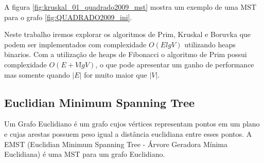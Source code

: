 \documentclass[12pt,a4paper]{article}
\begin{document}

A figura \ref{fig:kruskal_01_quadrado2009_mst} mostra um exemplo de uma MST para
o grafo \ref{fig:QUADRADO2009_ini}.


Neste trabalho iremos explorar os algoritmos de Prim, Kruskal e Boruvka que
podem ser implementados com complexidade $O(E lg V)$ utilizando heaps binarios.
Com a utilização de heaps de Fibonacci o algoritmo de Prim possui complexidade
$O(E + V lg V)$, o que pode apresentar um ganho de performance mas somente
quando $|E|$ for muito maior que $|V|$.

\subsection{Euclidian Minimum Spanning Tree}


Um Grafo Euclidiano é um grafo cujos vértices representam pontos em um plano e
cujas arestas possuem peso igual a distância euclidiana entre esses pontos. A
EMST (Euclidian Minimum Spanning Tree - Árvore Geradora Mínima Euclidiana) é uma
MST para um grafo Euclidiano. 


\end{document}
